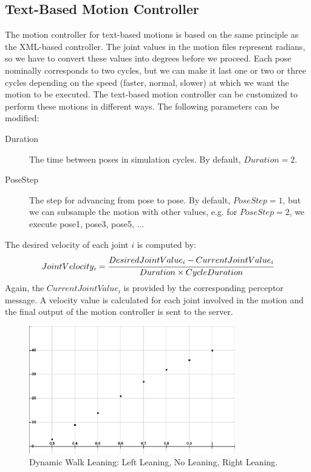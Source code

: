 \subsection{Text-Based Motion Controller}
The motion controller for text-based motions is based on the same principle as the XML-based controller. The joint values in the motion files represent radians, so we have to convert these values into degrees before we proceed. Each pose nominally corresponds to two cycles, but we can make it last one or two or three cycles depending on the speed (faster, normal, slower) at which we want the motion to be executed. The text-based motion controller can be customized to perform these motions in different ways. The following parameters can be modified:
\begin{description}
	\item[Duration] The time between poses in simulation cycles. By default, $Duration=2$.
	\item[PoseStep] The step for advancing from pose to pose. By default, $PoseStep=1$, but we can subsample the motion with other values, e.g. for $PoseStep=2$, we execute pose1, pose3, pose5, ...
\end{description}
The desired velocity of each joint $i$ is computed by:
\[
JointVelocity_i = \cfrac {Desired Joint Value_i - Current Joint Value_i} {Duration \times CycleDuration}
\]
Again, the $CurrentJointValue_i$ is provided by the corresponding perceptor message.
A velocity value is calculated for each joint involved in the motion and the final output of the motion controller is sent to the server. 

\begin{figure}[t!]
\centering
  \includegraphics[width=0.8\textwidth]{Chapter3/figures/DynamicTurn.pdf}
  \caption{Dynamic Walk Leaning: Left Leaning, No Leaning, Right Leaning.}
  \label{fig:Lean}
\end{figure}

